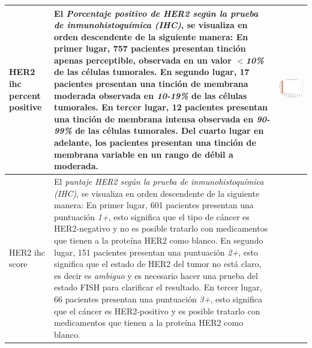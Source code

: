 \begin{table}[!htb]
\begin{threeparttable}
\begin{tabular}{p{2.5cm} p{7cm} p{6.5cm}}
			HER2 ihc percent positive
			& El \textit{Porcentaje positivo de HER2 según la prueba de inmunohistoquímica (IHC)}, se visualiza en orden descendente de la siguiente manera: En primer lugar, 757 pacientes presentan tinción apenas perceptible, observada en un valor $<$\textit{10\%} de las células tumorales. En segundo lugar, 17 pacientes presentan una tinción de membrana moderada observada en \textit{10-19\%} de las células tumorales. En tercer lugar, 12 pacientes presentan una tinción de membrana intensa observada en \textit{90-99\%} de las células tumorales. Del cuarto lugar en adelante, los pacientes presentan una tinción de membrana variable en un rango de débil a moderada.
			& \begin{center}\includegraphics[width=1\linewidth]{NOTEBOOK/IMAGENES_DESCRIPTIVAS/16_her_2_ihc_percent_positive}\end{center}
			\\ \hline
			
			HER2 ihc score
			& El \textit{puntaje HER2 según la prueba de inmunohistoquímica (IHC)}, se visualiza en orden descendente de la siguiente manera: En primer lugar, 601 pacientes presentan una puntuación \textit{1+}, esto significa  que el tipo de cáncer es HER2-negativo y no es posible tratarlo con medicamentos que tienen a la proteína HER2 como blanco. En segundo lugar, 151 pacientes presentan una puntuación \textit{2+}, esto significa que el estado de HER2 del tumor no está claro, es decir es \textit{ambiguo} y es necesario hacer una prueba del estado FISH para clarificar el resultado. En tercer lugar, 66 pacientes presentan una puntuación \textit{3+}, esto significa que el cáncer es HER2-positivo y es posible tratarlo con medicamentos que tienen a la proteína HER2 como blanco.
			

\end{tabular}
\end{threeparttable}
\end{table}
